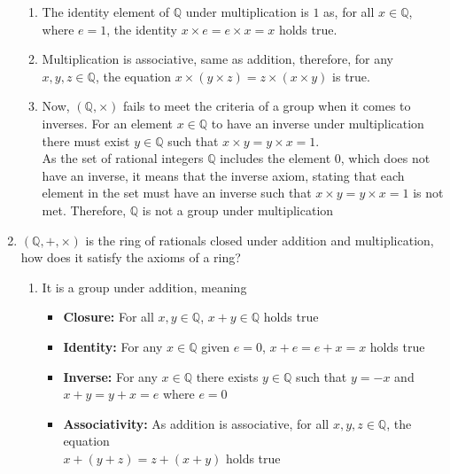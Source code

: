 \documentclass[11pt]{article}
\newcommand{\Q}{{\mathbb{Q}}}
\begin{document}
\begin{enumerate}[{\bf S1.}]
\begin{enumerate}
                \item 

                    The identity element of $\Q$ under multiplication is $1$ as, for all $x\in\Q$, where $e = 1$, the 
                    identity $x\times e = e\times x = x$ holds true. 

                \item 

                    Multiplication is associative, same as addition, therefore, for any $x, y, z\in\Q$, the equation
                    $x\times(y\times z) = z\times(x\times y)$ is true.

                \item 

                    Now, $(\Q, \times)$ fails to meet the criteria of a group when it comes to inverses. For an element $x\in\Q$
                    to have an inverse under multiplication there must exist $y\in\Q$ such that $x\times y = y\times x = 1$. \\

                    As the set of rational integers $\Q$ includes the element $0$, which does not have an inverse, it means 
                    that the inverse axiom, stating that each element in the set must have an inverse such that $x\times y = y\times x = 1$
                    is not met. Therefore, $\Q$ is not a group under multiplication

            \end{enumerate}

        \newpage

        \item $(\Q, +, \times)$ is the ring of rationals closed under addition and multiplication, how does it satisfy the axioms of a ring?
        
            \begin{enumerate}
                
                \item 

                    It is a group under addition, meaning

                    \begin{itemize}
                        \item \textbf{Closure:} For all $x, y\in\Q$, $x + y \in\Q$ holds true
                        \item \textbf{Identity:} For any $x\in\Q$ given $e = 0$, $x + e = e + x = x$ holds true
                        \item \textbf{Inverse:} For any $x\in\Q$ there exists $y\in\Q$ such that $y = -x$ and $x + y = y + x = e$ where $e = 0$
                        \item \textbf{Associativity: } As addition is associative, for all $x, y, z\in\Q$, the equation \\
                        $x + (y + z) = z + (x + y)$ holds true
                    \end{itemize}


\end{enumerate}
\end{enumerate}
\end{document}

